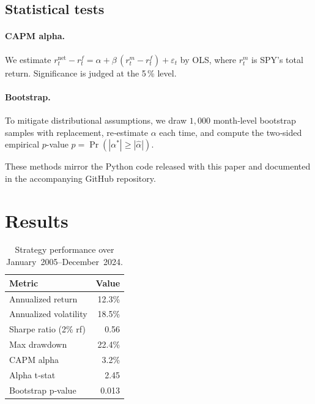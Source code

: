 \documentclass[11pt]{article}
\begin{document}
\subsection{Statistical tests}

\paragraph{CAPM alpha.}
We estimate
\(
r^{\text{net}}_t - r^f_t
  = \alpha + \beta\,(r^{m}_t - r^f_t) + \varepsilon_t
\)
by OLS, where \(r^{m}_t\) is SPY’s total return.  
Significance is judged at the 5 \% level.

\paragraph{Bootstrap.}
To mitigate distributional assumptions, we draw \(1{,}000\) month‑level bootstrap samples with replacement, re‑estimate \(\alpha\) each time, and compute the two‑sided empirical \(p\)-value
\(
p = \Pr(|\alpha^{*}| \ge |\hat{\alpha}|).
\)

These methods mirror the Python code released with this paper and documented in the accompanying GitHub repository.

\section{Results} \label{sec:results}
\begin{table}[h!]
  \centering
  \begin{tabular}{l r}
    \toprule
    Metric                  & Value     \\
    \midrule
    Annualized return       & 12.3\%    \\
    Annualized volatility   & 18.5\%    \\
    Sharpe ratio (2\% rf)   & 0.56      \\
    Max drawdown            & 22.4\%    \\
    CAPM alpha              & 3.2\%     \\
    Alpha t‑stat            & 2.45      \\
    Bootstrap p‑value       & 0.013     \\
    \bottomrule
  \end{tabular}
  \caption{Strategy performance over January 2005–December 2024.}
\end{table}
\end{document}
